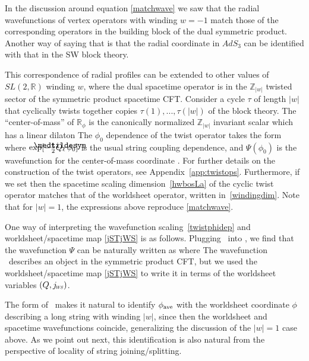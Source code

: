 \documentclass[12pt]{article}
\def\sltwo{\ensuremath{SL(2,\bR)}}
\def\ST{{\sst\it\! ST}}
\def\WS{{\sst\it\! WS}}
\newcommand\lowermedtildesym{%
  \text{\smash{\raisebox{-1.2ex}{%
    $\medtildesym$}}}}
\newcommand\medtilde[1]{%
  \mathchoice
    {\accentset{\displaystyle\lowermedtildesym}{#1}}
    {\accentset{\textstyle\lowermedtildesym}{#1}}
    {\accentset{\scriptstyle\lowermedtildesym}{#1}}
    {\accentset{\scriptscriptstyle\lowermedtildesym}{#1}}
}
\def\half{\frac12}
\def\coeff#1#2{{\textstyle \frac{#1}{#2}}}
\def\hf{\coeff12}
\newcommand{\bR}{{\mathbb R}}
\newcommand{\bZ}{{\mathbb Z}}
\numberwithin{equation}{section}
\def\sst{\scriptscriptstyle}
\def\coeff#1#2{{\textstyle{\frac{#1}{ #2}}}}
\def\half{\frac12}
\def\hf{{\textstyle\half}}
\def\exp{{\rm exp}}
\def\Qtil{{\widetilde Q}}
\begin{document}
In the discussion around equation \eqref{matchwave} we saw that the radial wavefunctions of vertex operators with winding $w=-1$ match those of the corresponding operators in the building block of the dual symmetric product. Another way of saying that is that the radial coordinate in $AdS_3$ can be identified with that in the SW block theory. 

This correspondence of radial profiles can be extended to other values of $\sltwo$ winding $w$, where the dual spacetime operator is in the $\bZ_{|w|}$ twisted sector of the symmetric product spacetime CFT.  Consider a cycle $\tau$ of length $|w|$ that cyclically twists together copies $\tau(1),...,\tau(|w|)$ of the block theory.
%
The ``center-of-mass'' of $\bR_\phi$ is the canonically normalized $\bZ_{|w|}$ invariant scalar
which has a linear dilaton 
\eqn[Qtilde]{\Qtil_\ell = \sqrt{|w|} \,Q_\ell~.}
The $\phi_0$ dependence of the twist operator takes the form
\eqn[twistphidep]{
\exp\big[-\hf\Qtil_\ell\, \phi_0\big]\,\Psi\big(\phi_0 \big)
~~,~~~~
\Psi\big(\phi_0 \big) = 
\exp\Big[ \frac{Q_\ell(j_\ST-\half)}{\sqrt{|w|}}\,\phi_0\Big]~,}
where $\exp[-\hf\medtilde Q_\ell\, \phi_0]$ is the usual string coupling dependence, and $\Psi(\phi_0)$ is the wavefunction for the center-of-mass coordinate \phizero.  
For further details on the construction of the twist operators, see Appendix~\ref{app:twistops}.
Furthermore, if we set
\eqn[jSTjWS]{Q_\ell\Big(j^{~}_{\ST}-\half\Big)=Q\Big(j^{~}_{\WS}-\frac{1}{2}\Big)~,}
then the spacetime scaling dimension~\eqref{hwbosLa} of the cyclic twist operator matches that of the worldsheet operator, written in~\eqref{windingdim}. 
Note that for $|w|=1$, the expressions above reproduce \eqref{matchwave}. 

One way of interpreting the wavefunction scaling~\eqref{twistphidep} and worldsheet/spacetime map \eqref{jSTjWS} is as follows. Plugging \jSTjWS\ into \twistphidep, we find that the wavefunction $\Psi$ can be naturally written as \eqn[newphi]{\Psi=\exp\Big[Q\left(j_\WS-\half\right)\,\phi_{\rm ave}\Big]~,
} 
where 
The wavefunction \newphi\ describes an object in the symmetric product CFT, but we used the worldsheet/spacetime map \eqref{jSTjWS} to write it in terms of the worldsheet variables $(Q,j_\WS)$. 

The form of \newphi\ makes it natural to identify $\phi_{\rm ave}$ with the worldsheet coordinate $\phi$ describing a long string with winding $|w|$, since then the worldsheet and spacetime wavefunctions coincide, generalizing the discussion of the $|w|=1$ case above. As we point out next, this identification is also natural from the perspective of locality of string joining/splitting. 
\end{document}
